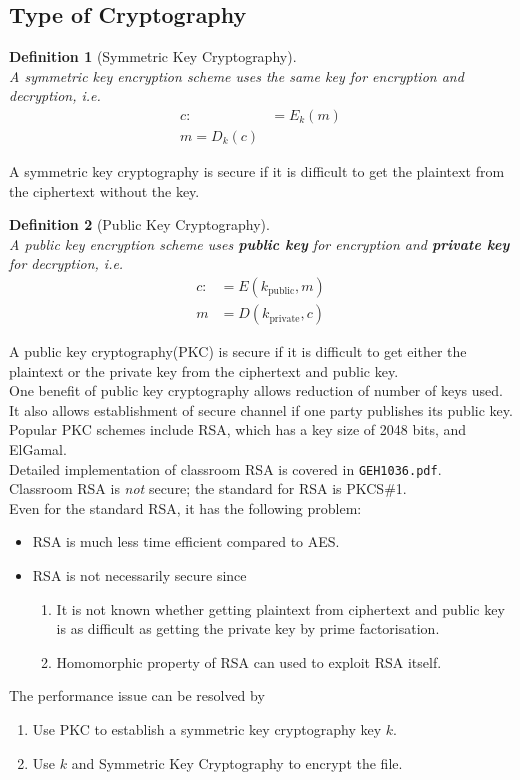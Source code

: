 \documentclass[12pt]{article}
\newtheorem{definition}{Definition}[section]
\theoremstyle{definition}
\begin{document}
\subsection{Type of Cryptography}
\begin{definition}[Symmetric Key Cryptography]
\hfill\\\normalfont A symmetric key encryption scheme uses the same key for encryption and decryption, i.e.
\begin{align*}
c:&=E_k(m)\\
m=D_k(c)
\end{align*}
\end{definition}
A symmetric key cryptography is secure if it is difficult to get the plaintext from the ciphertext without the key.
\begin{definition}[Public Key Cryptography]
\hfill\\\normalfont A public key encryption scheme uses \textbf{public key} for encryption and \textbf{private key} for decryption, i.e.
\begin{align*}
c:&=E(k_\text{public}, m)\\
m&=D(k_\text{private}, c)
\end{align*}
\end{definition}
A public key cryptography(PKC) is secure if it is difficult to get either the plaintext or the private key from the ciphertext and public key.\\
One benefit of public key cryptography allows reduction of number of keys used. It also allows establishment of secure channel if one party publishes its public key.\\

Popular PKC schemes include RSA, which has a key size of 2048 bits, and ElGamal.\\
Detailed implementation of classroom RSA is covered in \texttt{GEH1036.pdf}.\\
Classroom RSA is \textit{not} secure; the standard for RSA is PKCS\#1.\\

Even for the standard RSA, it has the following problem:
\begin{itemize}
  \item RSA is much less time efficient compared to AES.
  \item RSA is not necessarily secure since
  \begin{enumerate}
    \item It is not known whether getting plaintext from ciphertext and public key is as difficult as getting the private key by prime factorisation.
    \item Homomorphic property of RSA can used to exploit RSA itself.
  \end{enumerate}
\end{itemize}
The performance issue can be resolved by
\begin{enumerate}
  \item Use PKC to establish a symmetric key cryptography key $k$.
  \item Use $k$ and Symmetric Key Cryptography to encrypt the file.
\end{enumerate}
\end{document}
